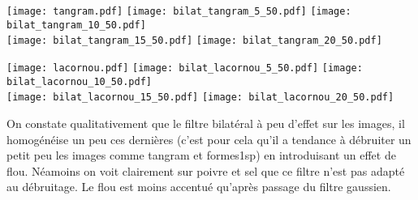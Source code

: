 \documentclass[12pt]{article}
\numberwithin{equation}{section}
\begin{document}
\begin{center}
\texttt{[image: tangram.pdf]}
\texttt{[image: bilat\_tangram\_5\_50.pdf]}
\texttt{[image: bilat\_tangram\_10\_50.pdf]}\\
\texttt{[image: bilat\_tangram\_15\_50.pdf]}
\texttt{[image: bilat\_tangram\_20\_50.pdf]}
\end{center}

\begin{center}
\texttt{[image: lacornou.pdf]}
\texttt{[image: bilat\_lacornou\_5\_50.pdf]}
\texttt{[image: bilat\_lacornou\_10\_50.pdf]}\\
\texttt{[image: bilat\_lacornou\_15\_50.pdf]}
\texttt{[image: bilat\_lacornou\_20\_50.pdf]}
\end{center}
On constate qualitativement que le filtre bilatéral à peu d'effet sur les images, il homogénéise un peu ces dernières (c'est pour cela qu'il a tendance à débruiter un petit peu les images comme tangram et formes1sp) en introduisant un effet de flou. Néamoins on voit clairement sur poivre et sel que ce filtre n'est pas adapté au débruitage. Le flou est moins accentué qu'après passage du filtre gaussien.
\end{document}
